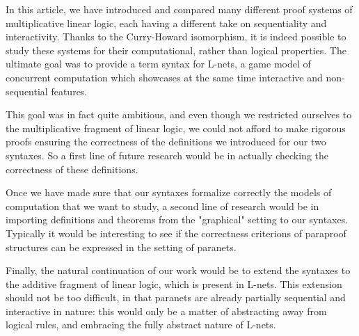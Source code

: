 \documentclass[12pt]{report}
\begin{document}
In this article, we have introduced and compared many different proof systems of multiplicative
linear logic, each having a different take on sequentiality and interactivity. Thanks to the
Curry-Howard isomorphism, it is indeed possible to study these systems for their computational,
rather than logical properties. The ultimate goal was to provide a term syntax for L-nets, a game
model of concurrent computation which showcases at the same time interactive and non-sequential
features.

This goal was in fact quite ambitious, and even though we restricted ourselves to the multiplicative
fragment of linear logic, we could not afford to make rigorous proofs ensuring the correctness of
the definitions we introduced for our two syntaxes. So a first line of future research would be in
actually checking the correctness of these definitions.

Once we have made sure that our syntaxes formalize correctly the models of computation that we want
to study, a second line of research would be in importing definitions and theorems from the
"graphical" setting to our syntaxes. Typically it would be interesting to see if the correctness
criterions of paraproof structures can be expressed in the setting of paranets.

Finally, the natural continuation of our work would be to extend the syntaxes to the additive
fragment of linear logic, which is present in L-nets. This extension should not be too difficult,
in that paranets are already partially sequential and interactive in nature: this would only be a
matter of abstracting away from logical rules, and embracing the fully abstract nature of L-nets.



\end{document}
